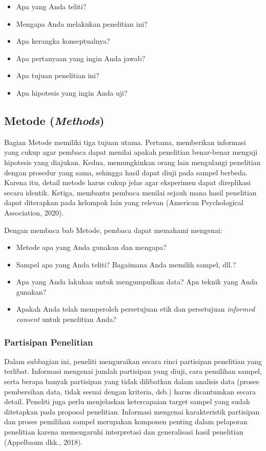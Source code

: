 \documentclass[
  indonesian,
  letterpaper,
  DIV=11,
  numbers=noendperiod]{scrreprt}
\providecommand{\tightlist}{%
  \setlength{\itemsep}{0pt}\setlength{\parskip}{0pt}}
\begin{document}
\begin{itemize}
\tightlist
\item
  Apa yang Anda teliti?
\item
  Mengapa Anda melakukan penelitian ini?
\item
  Apa kerangka konseptualnya?
\item
  Apa pertanyaan yang ingin Anda jawab?
\item
  Apa tujuan penelitian ini?
\item
  Apa hipotesis yang ingin Anda uji?
\end{itemize}

\subsection{\texorpdfstring{Metode
(\emph{Methods})}{Metode (Methods)}}\label{metode-methods}

Bagian Metode memiliki tiga tujuan utama. Pertama, memberikan informasi
yang cukup agar pembaca dapat menilai apakah penelitian benar‑benar
menguji hipotesis yang diajukan. Kedua, memungkinkan orang lain
mengulangi penelitian dengan prosedur yang sama, sehingga hasil dapat
diuji pada sampel berbeda. Karena itu, detail metode harus cukup jelas
agar eksperimen dapat direplikasi secara identik. Ketiga, membantu
pembaca menilai sejauh mana hasil penelitian dapat diterapkan pada
kelompok lain yang relevan (American Psychological Association, 2020).

Dengan membaca bab Metode, pembaca dapat memahami mengenai:

\begin{itemize}
\tightlist
\item
  Metode apa yang Anda gunakan dan mengapa?
\item
  Sampel apa yang Anda teliti? Bagaimana Anda memilih sampel, dll.?
\item
  Apa yang Anda lakukan untuk mengumpulkan data? Apa teknik yang Anda
  gunakan?
\item
  Apakah Anda telah memperoleh persetujuan etik dan persetujuan
  \emph{informed consent} untuk penelitian Anda?
\end{itemize}

\subsubsection{Partisipan Penelitian}\label{partisipan-penelitian}

Dalam subbagian ini, peneliti menguraikan secara rinci partisipan
penelitian yang terlibat. Informasi mengenai jumlah partisipan yang
diuji, cara pemilihan sampel, serta berapa banyak partisipan yang tidak
dilibatkan dalam analisis data (proses pembersihan data, tidak sesuai
dengan kriteria, dsb.) harus dicantumkan secara detail. Peneliti juga
perlu menjelaskan ketercapaian target sampel yang sudah ditetapkan pada
proposal penelitian. Informasi mengenai karakteristik partisipan dan
proses pemilihan sampel merupakan komponen penting dalam pelaporan
penelitian karena memengaruhi interpretasi dan generalisasi hasil
penelitian (Appelbaum dkk., 2018).
\end{document}

